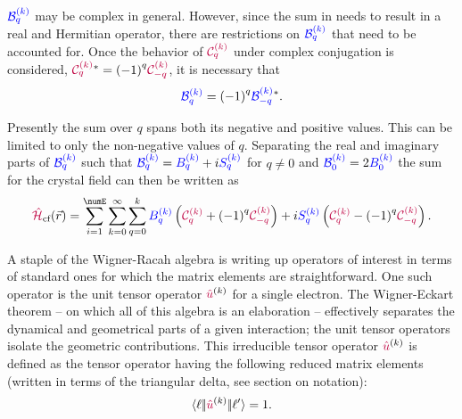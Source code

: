 \documentclass[11pt, twoside,openright]{article}
\begin{document}
    $\textcolor{blue}{\mathcal{B}^{(k)}_{q}}$ may be complex in general. However, since the sum in  needs to result in a real and Hermitian operator, there are restrictions on $\textcolor{blue}{\mathcal{B}^{(k)}_{q}}$ that need to be accounted for. Once the behavior of $\textcolor{purple}{\mathcal{C}^{(k)}_{q}}$ under complex conjugation is considered, $\textcolor{purple}{\mathcal{C}^{(k)}_{q}}{}^* = {(-1)}^{q}\textcolor{purple}{\mathcal{C}^{(k)}_{-q}}$, it is necessary that
    \begin{equation}
    	\textcolor{blue}{\mathcal{B}^{(k)}_{q}} = {(-1)}^{q}\textcolor{blue}{\mathcal{B}^{(k)}_{-q}}^{*}.
    \end{equation}
    
    Presently the sum over $q$ spans both its negative and positive values. This can be limited to only the non-negative values of $q$. Separating the real and imaginary parts of $\textcolor{blue}{\mathcal{B}^{(k)}_{q}}$ such that $\textcolor{blue}{\mathcal{B}^{(k)}_{q}} = \textcolor{blue}{B^{(k)}_{q}} + i \textcolor{blue}{S^{(k)}_{q}}$ for $q\neq{0}$ and $\textcolor{blue}{\mathcal{B}^{(k)}_{0}} = 2\textcolor{blue}{B^{(k)}_{0}}$ the sum for the crystal field can then be written as
    \begin{equation}
        \hamCrystalFieldSymbol(\vec{r}) = 
        	\sum_{i=1}^\numE
        	\sum_{k=0}^\infty
        	\sum_{q=0}^{k} \Bkq{k}{q} \left(\Ckq{k}{q} + \phaser{q}\Ckq{k}{-q}\right) + i \Skq{k}{q} \left(\Ckq{k}{q} - \phaser{q}\Ckq{k}{-q}\right).
    \label{eqn:better crystal sum}
    \end{equation}
    
    A staple of the Wigner-Racah algebra is writing up operators of interest in terms of standard ones for which the matrix elements are straightforward.  One such operator is the unit tensor operator $\textcolor{purple}{\hat{u}}^{(k)}$ for a single electron. The Wigner-Eckart theorem -- on which all of this algebra is an elaboration -- effectively separates the dynamical and geometrical parts of a given interaction; the unit tensor operators isolate the geometric contributions. This irreducible tensor operator $\textcolor{purple}{\hat{u}}^{(k)}$ is defined as the tensor operator having the following reduced matrix elements (written in terms of the triangular delta, see section on notation):
    \begin{equation}
    \langle \ell|\!|\textcolor{purple}{\hat{u}}^{(k)}|\!|\ell'\rangle = 1.
    \end{equation}
\end{document}
